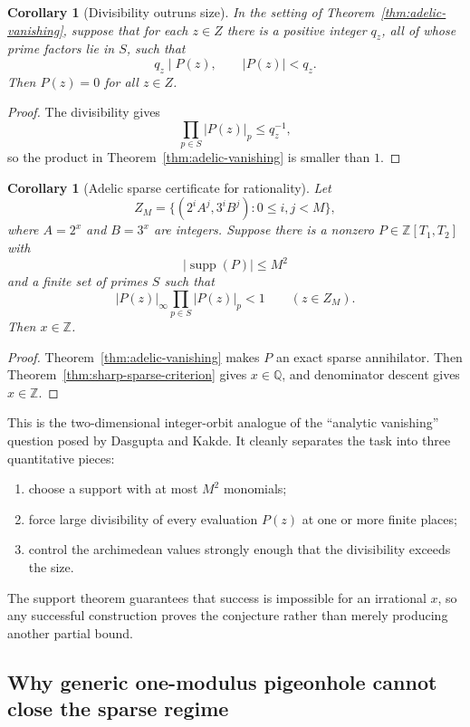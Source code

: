 \documentclass[11pt,oneside]{article}
\newtheorem{corollary}[theorem]{Corollary}
\theoremstyle{definition}
\theoremstyle{remark}
\newcommand{\Z}{\mathbb Z}
\newcommand{\Q}{\mathbb Q}
\newcommand{\supp}{\operatorname{supp}}
\begin{document}
\begin{corollary}[Divisibility outruns size]
\label{cor:divisibility-outruns-size}
In the setting of Theorem~\ref{thm:adelic-vanishing}, suppose that for each $z\in Z$ there is
a positive integer $q_z$, all of whose prime factors lie in $S$, such that
\[
  q_z\mid P(z),
  \qquad
  |P(z)|<q_z.
\]
Then $P(z)=0$ for all $z\in Z$.
\end{corollary}

\begin{proof}
The divisibility gives
\[
  \prod_{p\in S}|P(z)|_p\le q_z^{-1},
\]
so the product in Theorem~\ref{thm:adelic-vanishing} is smaller than $1$.
\end{proof}

\begin{corollary}[Adelic sparse certificate for rationality]
\label{cor:adelic-sparse-rationality}
Let
\[
  Z_M=\{(2^iA^j,3^iB^j):0\le i,j<M\},
\]
where $A=2^x$ and $B=3^x$ are integers.  Suppose there is a nonzero
$P\in\Z[T_1,T_2]$ with
\[
  |\supp(P)|\le M^2
\]
and a finite set of primes $S$ such that
\[
  |P(z)|_\infty\prod_{p\in S}|P(z)|_p<1
  \qquad(z\in Z_M).
\]
Then $x\in\Z$.
\end{corollary}

\begin{proof}
Theorem~\ref{thm:adelic-vanishing} makes $P$ an exact sparse annihilator.  Then
Theorem~\ref{thm:sharp-sparse-criterion} gives $x\in\Q$, and denominator descent gives
$x\in\Z$.
\end{proof}

This is the two-dimensional integer-orbit analogue of the ``analytic vanishing'' question
posed by Dasgupta and Kakde.  It cleanly separates the task into three quantitative pieces:
\begin{enumerate}
\item choose a support with at most $M^2$ monomials;
\item force large divisibility of every evaluation $P(z)$ at one or more finite places;
\item control the archimedean values strongly enough that the divisibility exceeds the size.
\end{enumerate}
The support theorem guarantees that success is impossible for an irrational $x$, so any
successful construction proves the conjecture rather than merely producing another partial
bound.

\subsection{Why generic one-modulus pigeonhole cannot close the sparse regime}
\label{sec:sparse-pigeonhole}
\end{document}
